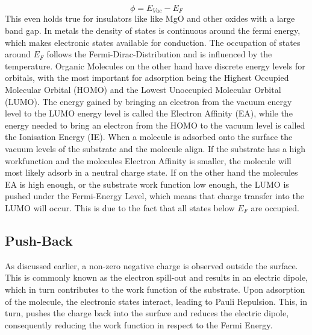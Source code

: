 \begin{equation}
    \phi = E_{Vac} - E_F
\end{equation}
This even holds true for insulators like like MgO and other oxides with a large band gap.
In metals the density of states is continuous around the fermi energy, which makes electronic states available for conduction.
The occupation of states around $E_F$ follows the Fermi-Dirac-Distribution and is influenced by the temperature.
Organic Molecules on the other hand have discrete energy levels for orbitals, with the most important for adsorption being the Highest Occupied Molecular Orbital (HOMO) and the Lowest Unoccupied Molecular Orbital (LUMO).
The energy gained by bringing an electron from the vacuum energy level to the LUMO energy level is called the Electron Affinity (EA), while the energy needed to bring an electron from the HOMO to the vacuum level is called the Ionisation Energy (IE).
When a molecule is adsorbed onto the surface the vacuum levels of the substrate and the molecule align.
If the substrate has a high workfunction and the molecules Electron Affinity is smaller, the molecule will most likely adsorb in a neutral charge state.
If on the other hand the molecules EA is high enough, or the substrate work function low enough, the LUMO is pushed under the Fermi-Energy Level, which means that charge transfer into the LUMO will occur.
This is due to the fact that all states below $E_F$ are occupied.\\
\subsection{Push-Back}
As discussed earlier, a non-zero negative charge is observed outside the surface. 
This is commonly known as the electron spill-out and results in an electric dipole, which in turn contributes to the work function of the substrate. 
Upon adsorption of the molecule, the electronic states interact, leading to Pauli Repulsion. 
This, in turn, pushes the charge back into the surface and reduces the electric dipole, consequently reducing the work function in respect to the Fermi Energy.
